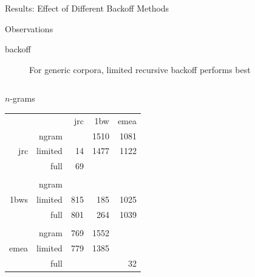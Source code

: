 \begin{frame}{Results: Effect of Different Backoff Methods}
    \begin{block}{Observations}
        \begin{description}
            \item[backoff] For generic corpora, limited recursive backoff performs best
        \end{description}
    \end{block}
    \vspace{-1em}
    {\small
        \begin{columns}[T,totalwidth=\textwidth]
            \begin{column}{0.5\textwidth}
                \begin{block}{\hspace{2.55cm}$n$-grams\vphantom{Skipgrams}}
                    \begin{tabular}{rrrrr}
                        & & jrc & 1bw & emea \\ \cline{3-5}
                        \multirow{3}{*}{jrc} & ngram & \cellcolor{green!25}{13} & 1510 & 1081 \\
                        & limited& 14 & 1477 & 1122 \\
                        & full & 69 & \cellcolor{green!25}{1195} & \cellcolor{green!25}{961} \\
                        &&&& \\
                        \multirow{3}{*}{1bws} & ngram & \cellcolor{green!25}{768} & \cellcolor{green!25}{158} & \cellcolor{green!25}{946} \\
                        & limited& 815 & 185 & 1025 \\
                        & full & 801 & 264 & 1039 \\
                        &&&& \\
                        \multirow{3}{*}{emea} & ngram & 769 & 1552 & \cellcolor{green!25}{4} \\
                        & limited& 779 & 1385 & \cellcolor{green!25}{4} \\
                        & full & \cellcolor{green!25}{600} & \cellcolor{green!25}{1143} & 32
                    \end{tabular}
                \end{block}
            \end{column}
            \begin{column}{0.5\textwidth}

\end{column}
\end{columns}}
\end{frame}
